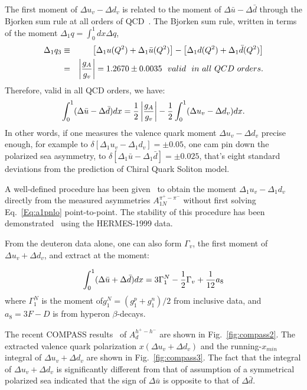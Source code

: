 The first moment of $\Delta u_v - \Delta d_v$ is related to the moment 
of $\Delta \bar{u} -\Delta \bar{d}$ through the Bjorken sum rule at all orders of QCD~\cite{ssissakian2}.
The Bjorken sum rule, written in terms of 
the moment $\Delta_1 q=\int_0^1dx \Delta q$,
\begin{eqnarray}
\label{Eq:bsr1}
\Delta_1 q_3 & \equiv & \left[ \Delta_1 u(Q^2)+ \Delta_1 \bar{u}(Q^2) \right] - 
\left[ \Delta_1 d(Q^2)+ \Delta_1 \bar{d}(Q^2) \right] \nonumber \\
 & =& \left| {g_A \over g_v} \right| =1.2670 \pm 0.0035 ~~valid~~ in ~ all ~ QCD ~ orders. 
\end{eqnarray}
Therefore, valid in all QCD orders, we have:
\begin{eqnarray}
\label{Eq:bsr2}
\int_0^1(\Delta \bar{u}  - \Delta \bar{d})dx = {1 \over 2} \left| {g_A \over g_v} \right|
- {1 \over 2} \int_0^1(\Delta {u_v}  - \Delta {d_v} )dx.
\end{eqnarray}
%
In other words, if one  measures the valence quark moment $\Delta {u_v}  - \Delta {d_v}$ precise enough, for example to 
$\delta \left[ \Delta_1 u_v - \Delta_1 d_v \right] = \pm 0.05$,  
one cam pin down the polarized sea asymmetry, to $\delta \left[ \Delta_1 \bar{u} - \Delta_1 \bar{d} \right] = \pm 0.025$, that's 
 eight standard deviations from the prediction of Chiral Quark Soliton model.

A well-defined procedure has been given~\cite{ssissakian2}
 to obtain the moment $\Delta_1 {u_v}  - \Delta_1 {d_v}$ directly
 from the measured asymmetries $A_{1N}^{\pi^+ - \pi^-}$ without 
first solving Eq.~\ref{Eq:a1pnlo} point-to-point. 
The stability of this procedure has been demonstrated~\cite{ssissakian2}
using the HERMES-1999 data.

From the deuteron data alone, one can also form $\Gamma_v$, the first moment of $\Delta u_v + \Delta d_v$, and extract
at \lo the moment:

\begin{equation}
 \int_0^1 (\Delta \bar{u} +\Delta \bar{d})dx = 3 \Gamma_1^N -{1 \over 2}\Gamma_v+{1 \over 12} a_8 
\end{equation}
where $\Gamma_1^N$ is the moment of$g_1^N=(g_1^p+g_1^n)/2$ from inclusive data, and $a_8=3F-D$ is from hyperon $\beta$-decays.

The recent COMPASS results~\cite{compass2007} of $A_d^{h^+ - h^-}$ are shown in Fig.~\ref{fig:compass2}. The extracted valence
quark polarization $x(\Delta u_v + \Delta d_v)$ and the running-$x_{min}$ integral of $\Delta u_v + \Delta d_v$ are 
shown in Fig.~\ref{fig:compass3}.  The fact that the integral of $\Delta u_v + \Delta d_v$ is significantly different from that of 
assumption of a symmetrical polarized sea indicated that the sign of $\Delta \bar{u}$ is opposite to that of $\Delta \bar{d}$.       

